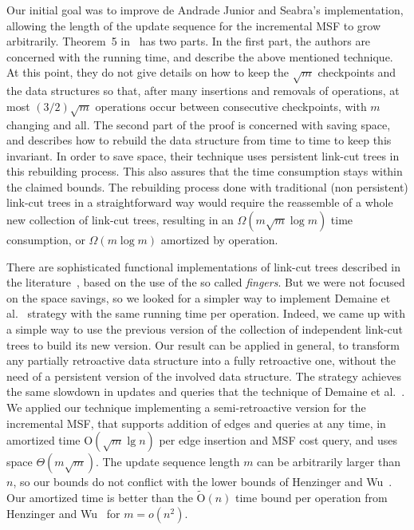 \documentclass[3p,times,procedia]{elsarticle}
\newcommand{\Oh}{\mathrm{O}}
\begin{document}
Our initial goal was to improve de Andrade Junior and Seabra's implementation,
allowing the length of the update sequence for the incremental MSF to grow arbitrarily.
Theorem~5 in~\cite{DemaineIL2007} has two parts.  In the first part, the authors
are concerned with the running time, and describe the above mentioned technique.
At this point, they do not give details on how to keep the $\sqrt{m}$ checkpoints 
and the data structures so that, after many insertions and removals of operations, 
at most $(3/2)\sqrt{m}$ operations occur between consecutive checkpoints, with 
$m$ changing and all. The second part of the proof is concerned with saving space, 
and describes how to rebuild the data structure from time to time to keep this
invariant.  In order to save space, their technique uses persistent link-cut 
trees in this rebuilding process.  This also assures that the time consumption
stays within the claimed bounds.  The rebuilding process done with traditional
(non persistent) link-cut trees in a straightforward way would require the 
reassemble of a whole new collection of link-cut trees, resulting in an 
$\Omega(m \sqrt{m} \log{m})$ time consumption, or $\Omega(m \log{m})$ 
amortized by operation.

There are sophisticated functional implementations of link-cut trees described in 
the literature~\cite{DemaineLP2008}, based on the use of the so called \emph{fingers}.  
But we were not focused on the space savings, so we looked for a simpler way to 
implement Demaine et al.~\cite{DemaineIL2007} strategy with the same running time 
per operation.  Indeed, we came up with a simple way to use the previous version 
of the collection of independent link-cut trees to build its new version.  
Our result can be applied in general, to transform any partially retroactive 
data structure into a fully retroactive one, without the need of a persistent 
version of the involved data structure.  The strategy achieves the same slowdown 
in updates and queries that the technique of Demaine et al.~\cite{DemaineIL2007}.  
We applied our technique implementing a semi-retroactive version for the 
incremental MSF, that supports addition of edges and queries at any time, 
in amortized time $\Oh(\sqrt{m}\lg n)$ per edge insertion and MSF cost query, 
and uses space $\Theta(m\sqrt{m})$.  The update sequence length $m$ can be 
arbitrarily larger than~$n$, so our bounds do not conflict with the lower 
bounds of Henzinger and Wu~\cite{HenzingerW2021}. Our amortized time is better 
than the $\tilde{\Oh}(n)$ time bound per operation from Henzinger and 
Wu~\cite{HenzingerW2021} for $m = o(n^2)$.
\end{document}
